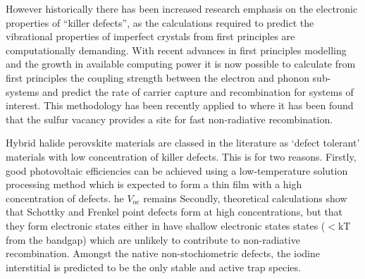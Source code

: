 However historically there has been increased research emphasis on the electronic properties of ``killer defects'', as the calculations required to predict the vibrational properties of imperfect crystals from first principles are computationally demanding.
With recent advances in first principles modelling \cite{Alkauskas2014}%
and the growth in available computing power\cite{}
it is now possible to calculate from first principles the coupling strength between the electron and phonon sub-systems and predict the rate of carrier capture and recombination for systems of interest. 
This methodology has been recently applied to  where it has been found that the sulfur vacancy provides a site for fast non-radiative recombination.

Hybrid halide perovskite materials are classed in the literature as `defect tolerant' materials with low concentration of killer defects. This is for two reasons. 
Firstly, good photovoltaic efficiencies can be achieved using a low-temperature solution processing method which is expected to form a thin film with a high concentration of defects. 
he $V_\mathrm{oc}$ remains
Secondly, theoretical calculations show that Schottky and Frenkel point defects form at high concentrations, but that they form electronic states either in have shallow electronic states states ($< \mathrm{kT}$ from the bandgap) which are unlikely to contribute to non-radiative recombination.
Amongst the native non-stochiometric defects, the iodine interstitial is predicted to be the only stable and active trap species.




